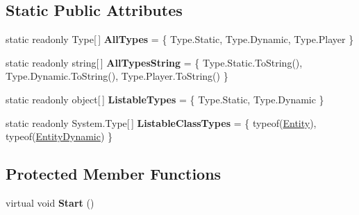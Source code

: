 \subsection*{Static Public Attributes}
\begin{DoxyCompactItemize}
\item 
\hypertarget{class_skyrates_1_1_common_1_1_entity_1_1_entity_aa2264aa396ec6c08519c50f6e872596e}{static readonly Type\mbox{[}$\,$\mbox{]} {\bfseries All\-Types} = \{ Type.\-Static, Type.\-Dynamic, Type.\-Player \}}\label{class_skyrates_1_1_common_1_1_entity_1_1_entity_aa2264aa396ec6c08519c50f6e872596e}

\item 
\hypertarget{class_skyrates_1_1_common_1_1_entity_1_1_entity_a824e2b260185ecccfa385b4a80eab46c}{static readonly string\mbox{[}$\,$\mbox{]} {\bfseries All\-Types\-String} = \{ Type.\-Static.\-To\-String(), Type.\-Dynamic.\-To\-String(), Type.\-Player.\-To\-String() \}}\label{class_skyrates_1_1_common_1_1_entity_1_1_entity_a824e2b260185ecccfa385b4a80eab46c}

\item 
\hypertarget{class_skyrates_1_1_common_1_1_entity_1_1_entity_adc830384f250e2d5f9b33229d91885ce}{static readonly object\mbox{[}$\,$\mbox{]} {\bfseries Listable\-Types} = \{ Type.\-Static, Type.\-Dynamic \}}\label{class_skyrates_1_1_common_1_1_entity_1_1_entity_adc830384f250e2d5f9b33229d91885ce}

\item 
\hypertarget{class_skyrates_1_1_common_1_1_entity_1_1_entity_a9abf8cce12c295b351195de009cfd007}{static readonly System.\-Type\mbox{[}$\,$\mbox{]} {\bfseries Listable\-Class\-Types} = \{ typeof(\hyperlink{class_skyrates_1_1_common_1_1_entity_1_1_entity}{Entity}), typeof(\hyperlink{class_skyrates_1_1_common_1_1_entity_1_1_entity_dynamic}{Entity\-Dynamic}) \}}\label{class_skyrates_1_1_common_1_1_entity_1_1_entity_a9abf8cce12c295b351195de009cfd007}

\end{DoxyCompactItemize}
\subsection*{Protected Member Functions}
\begin{DoxyCompactItemize}
\item 
\hypertarget{class_skyrates_1_1_common_1_1_entity_1_1_entity_acb5cc7450eefd4c794e9f72e0a422834}{virtual void {\bfseries Start} ()}\label{class_skyrates_1_1_common_1_1_entity_1_1_entity_acb5cc7450eefd4c794e9f72e0a422834}

\end{DoxyCompactItemize}
